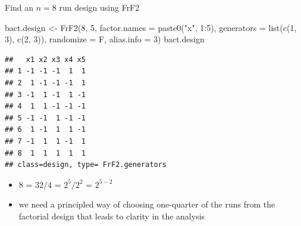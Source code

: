 \documentclass[
  ignorenonframetext,
]{beamer}
\newenvironment{Shaded}{\begin{snugshade}}{\end{snugshade}}
\newcommand{\AttributeTok}[1]{\textcolor[rgb]{0.77,0.63,0.00}{#1}}
\newcommand{\DecValTok}[1]{\textcolor[rgb]{0.00,0.00,0.81}{#1}}
\newcommand{\FunctionTok}[1]{\textcolor[rgb]{0.00,0.00,0.00}{#1}}
\newcommand{\NormalTok}[1]{#1}
\newcommand{\OtherTok}[1]{\textcolor[rgb]{0.56,0.35,0.01}{#1}}
\newcommand{\SpecialCharTok}[1]{\textcolor[rgb]{0.00,0.00,0.00}{#1}}
\newcommand{\StringTok}[1]{\textcolor[rgb]{0.31,0.60,0.02}{#1}}
\providecommand{\tightlist}{%
  \setlength{\itemsep}{0pt}\setlength{\parskip}{0pt}}
\begin{document}
\begin{frame}[fragile]{}
\protect\hypertarget{section-10}{}
Find an \(n=8\) run design using FrF2

\begin{Shaded}
\begin{Highlighting}[]
\NormalTok{bact.design }\OtherTok{\textless{}{-}} \FunctionTok{FrF2}\NormalTok{(}\DecValTok{8}\NormalTok{, }\DecValTok{5}\NormalTok{, }\AttributeTok{factor.names =} \FunctionTok{paste0}\NormalTok{(}\StringTok{"x"}\NormalTok{, }\DecValTok{1}\SpecialCharTok{:}\DecValTok{5}\NormalTok{), }
     \AttributeTok{generators =} \FunctionTok{list}\NormalTok{(}\FunctionTok{c}\NormalTok{(}\DecValTok{1}\NormalTok{, }\DecValTok{3}\NormalTok{), }\FunctionTok{c}\NormalTok{(}\DecValTok{2}\NormalTok{, }\DecValTok{3}\NormalTok{)), }\AttributeTok{randomize =}\NormalTok{ F, }\AttributeTok{alias.info =} \DecValTok{3}\NormalTok{)}
\NormalTok{bact.design}
\end{Highlighting}
\end{Shaded}

\begin{verbatim}
##   x1 x2 x3 x4 x5
## 1 -1 -1 -1  1  1
## 2  1 -1 -1 -1  1
## 3 -1  1 -1  1 -1
## 4  1  1 -1 -1 -1
## 5 -1 -1  1 -1 -1
## 6  1 -1  1  1 -1
## 7 -1  1  1 -1  1
## 8  1  1  1  1  1
## class=design, type= FrF2.generators
\end{verbatim}

\begin{itemize}
\tightlist
\item
  \(8\) = \(32/4\) = \(2^5/2^2\) = \(2^{5-2}\)
\item
  we need a principled way of choosing one-quarter of the runs from the
  factorial design that leads to clarity in the analysis
\end{itemize}
\end{frame}
\end{document}
